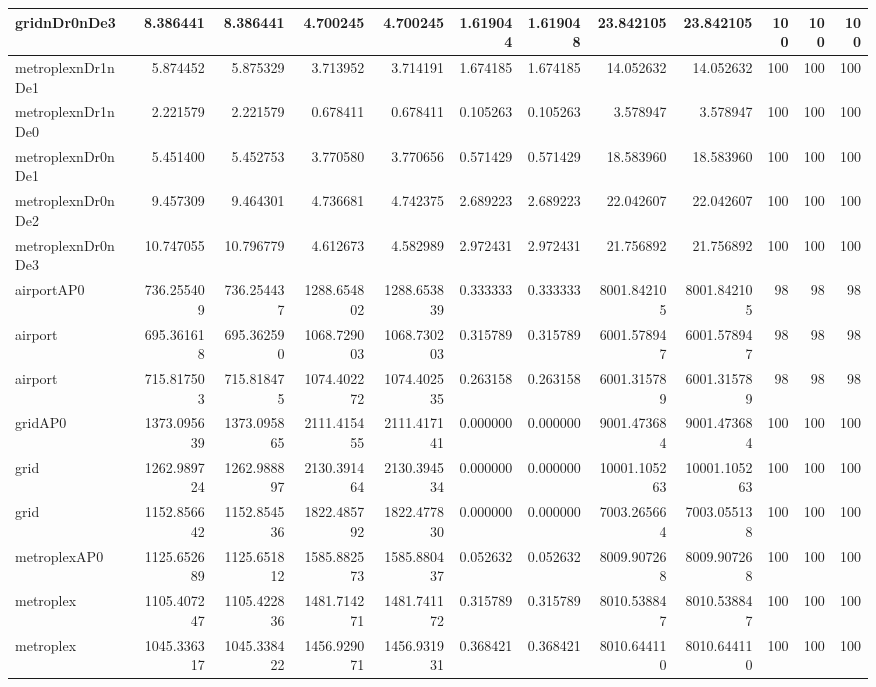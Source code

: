 \begin{longtable}{|l|r|r|r|r|r|r|r|r|r|r|r|}
gridnDr0nDe3 & 8.386441 & 8.386441 & 4.700245 & 4.700245 & 1.619044 & 1.619048 & 23.842105 & 23.842105 & 100 & 100 & 100 \\ \hline
metroplexnDr1nDe1 & 5.874452 & 5.875329 & 3.713952 & 3.714191 & 1.674185 & 1.674185 & 14.052632 & 14.052632 & 100 & 100 & 100 \\ \hline
metroplexnDr1nDe0 & 2.221579 & 2.221579 & 0.678411 & 0.678411 & 0.105263 & 0.105263 & 3.578947 & 3.578947 & 100 & 100 & 100 \\ \hline
metroplexnDr0nDe1 & 5.451400 & 5.452753 & 3.770580 & 3.770656 & 0.571429 & 0.571429 & 18.583960 & 18.583960 & 100 & 100 & 100 \\ \hline
metroplexnDr0nDe2 & 9.457309 & 9.464301 & 4.736681 & 4.742375 & 2.689223 & 2.689223 & 22.042607 & 22.042607 & 100 & 100 & 100 \\ \hline
metroplexnDr0nDe3 & 10.747055 & 10.796779 & 4.612673 & 4.582989 & 2.972431 & 2.972431 & 21.756892 & 21.756892 & 100 & 100 & 100 \\ \hline
airportAP0 & 736.255409 & 736.254437 & 1288.654802 & 1288.653839 & 0.333333 & 0.333333 & 8001.842105 & 8001.842105 & 98 & 98 & 98 \\ \hline
airport & 695.361618 & 695.362590 & 1068.729003 & 1068.730203 & 0.315789 & 0.315789 & 6001.578947 & 6001.578947 & 98 & 98 & 98 \\ \hline
airport & 715.817503 & 715.818475 & 1074.402272 & 1074.402535 & 0.263158 & 0.263158 & 6001.315789 & 6001.315789 & 98 & 98 & 98 \\ \hline
gridAP0 & 1373.095639 & 1373.095865 & 2111.415455 & 2111.417141 & 0.000000 & 0.000000 & 9001.473684 & 9001.473684 & 100 & 100 & 100 \\ \hline
grid & 1262.989724 & 1262.988897 & 2130.391464 & 2130.394534 & 0.000000 & 0.000000 & 10001.105263 & 10001.105263 & 100 & 100 & 100 \\ \hline
grid & 1152.856642 & 1152.854536 & 1822.485792 & 1822.477830 & 0.000000 & 0.000000 & 7003.265664 & 7003.055138 & 100 & 100 & 100 \\ \hline
metroplexAP0 & 1125.652689 & 1125.651812 & 1585.882573 & 1585.880437 & 0.052632 & 0.052632 & 8009.907268 & 8009.907268 & 100 & 100 & 100 \\ \hline
metroplex & 1105.407247 & 1105.422836 & 1481.714271 & 1481.741172 & 0.315789 & 0.315789 & 8010.538847 & 8010.538847 & 100 & 100 & 100 \\ \hline
metroplex & 1045.336317 & 1045.338422 & 1456.929071 & 1456.931931 & 0.368421 & 0.368421 & 8010.644110 & 8010.644110 & 100 & 100 & 100 \\ \hline

\end{longtable}
